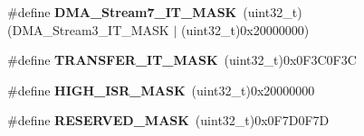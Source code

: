 \begin{DoxyCompactItemize}
\item 
\hypertarget{group___d_m_a_ga1fe8cb133c442e62bd082adee93a890e}{\#define {\bfseries D\-M\-A\-\_\-\-Stream7\-\_\-\-I\-T\-\_\-\-M\-A\-S\-K}~(uint32\-\_\-t)(D\-M\-A\-\_\-\-Stream3\-\_\-\-I\-T\-\_\-\-M\-A\-S\-K $|$ (uint32\-\_\-t)0x20000000)}\label{group___d_m_a_ga1fe8cb133c442e62bd082adee93a890e}

\item 
\hypertarget{group___d_m_a_ga802b72c1de784e703af80a6910592a5e}{\#define {\bfseries T\-R\-A\-N\-S\-F\-E\-R\-\_\-\-I\-T\-\_\-\-M\-A\-S\-K}~(uint32\-\_\-t)0x0\-F3\-C0\-F3\-C}\label{group___d_m_a_ga802b72c1de784e703af80a6910592a5e}

\item 
\hypertarget{group___d_m_a_ga375c64407de662589e2b12ac4e5e0489}{\#define {\bfseries H\-I\-G\-H\-\_\-\-I\-S\-R\-\_\-\-M\-A\-S\-K}~(uint32\-\_\-t)0x20000000}\label{group___d_m_a_ga375c64407de662589e2b12ac4e5e0489}

\item 
\hypertarget{group___d_m_a_ga1092a089e682f72660b95df5ee92a167}{\#define {\bfseries R\-E\-S\-E\-R\-V\-E\-D\-\_\-\-M\-A\-S\-K}~(uint32\-\_\-t)0x0\-F7\-D0\-F7\-D}\label{group___d_m_a_ga1092a089e682f72660b95df5ee92a167}

\end{DoxyCompactItemize}
